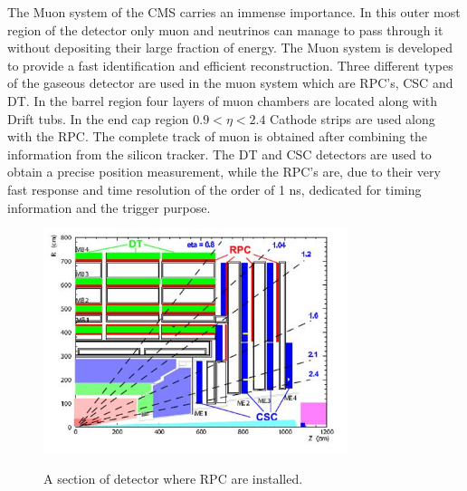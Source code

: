 The Muon system of the CMS carries an immense importance. In
this outer most region of the detector only muon and neutrinos
can manage to pass through it without depositing their large
fraction of energy. The Muon system is developed to provide a
fast identification and efficient reconstruction. Three
different types of the gaseous detector are used in the muon
system which are RPC's, CSC and DT. In the barrel region four
layers of muon chambers are located along with Drift tubs. In
the end cap region $0.9 < \eta < 2.4$ Cathode strips are used
along with the RPC. The complete track of muon is obtained
after combining the information from the silicon tracker.  The
DT and CSC detectors are used to obtain a precise position
measurement, while the RPC's are, due to their very fast
response and time resolution of the order of 1 ns, dedicated
for timing information and the trigger
purpose\cite{muon1997,Cosmic}.
    \begin{figure}[h]
    \begin{center}
    \includegraphics[width=3.5in]{pic/rpclayout} \\
    \caption{A section of detector where RPC are installed.}
    \end{center}
    \end{figure}
\smallskip
